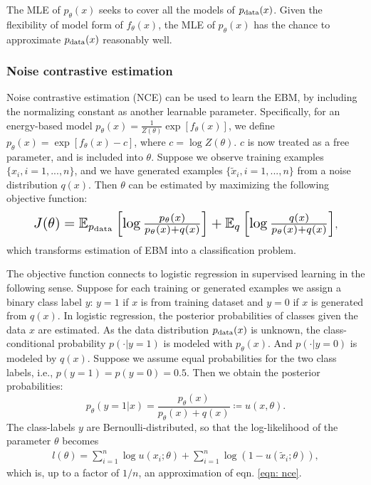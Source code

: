 \documentclass[10pt,twocolumn,letterpaper]{article}
\newcommand{\E}{\mathbb{E}}
\begin{document}
The MLE of $p_\theta(x)$ seeks to cover all the models of $p_{\rm data}(x)$. Given the flexibility of model form of $f_\theta(x)$, the MLE of $p_\theta(x)$ has the chance to approximate $p_{\rm data}(x)$ reasonably well. 

\subsubsection{Noise contrastive estimation}
\label{section: nce}
Noise contrastive estimation (NCE) \cite{gutmann2010noise} can be used to learn the EBM, by including the normalizing constant as another learnable parameter. Specifically, for an energy-based model $p_{\theta}(x) = \frac{1}{Z(\theta)}\exp[f_{\theta}(x)]$, we define $p_{\theta}(x) = \exp[f_{\theta}(x) - c]$, where $c = \log Z(\theta)$. $c$ is now treated as a free parameter, and is included into $\theta$. Suppose we observe training examples  $\{x_i, i = 1,...,n\}$, and we have generated examples $\{\tilde{x}_i, i = 1,...,n\}$ from a noise distribution $q(x)$. Then $\theta$ can be estimated by maximizing the following objective function: 
\begin{equation}
	\resizebox{.88\linewidth}{!}{$J(\theta) = \E_{p_{\rm data}}\left[ \log \frac{p_\theta(x)}{p_\theta(x) +  q(x)}\right] + \E_q\left[\log\frac{q(x)}{p_\theta(x) + q(x)}\right]$},
	\label{eqn: nce}
\end{equation}
which transforms estimation of EBM into a classification problem. 

The objective function connects to logistic regression in supervised learning in the following sense. Suppose for each training or generated examples we assign a binary class label $y$: $y = 1$ if $x$ is from training dataset and $y = 0$ if $x$ is generated from $q(x)$. In logistic regression, the posterior probabilities of classes given the data $x$ are estimated. As the data distribution $p_{\rm data}(x)$ is unknown, the class-conditional probability $p(\cdot|y = 1)$ is modeled with $p_\theta(x)$. And $p(\cdot|y=0)$ is modeled by $q(x)$. Suppose we assume equal probabilities for the two class labels, i.e., $p(y=1) = p(y=0) = 0.5 $. Then we obtain the posterior probabilities:
\begin{equation}
p_\theta(y=1|x) = \frac{p_\theta(x)}{p_\theta(x) + q(x)} \coloneqq u(x, \theta).
\end{equation}
The class-labels $y$ are Bernoulli-distributed, so that the log-likelihood of the parameter $\theta$ becomes 
\begin{equation}
	\begin{split}
		l(\theta) = \sum_{i=1}^n\log u(x_i;\theta) + \sum_{i=1}^n \log(1 - u(\tilde{x}_i; \theta)),
	\end{split}
\end{equation}
which is, up to a factor of $1/n$, an approximation of eqn. \ref{eqn: nce}.
\end{document}
